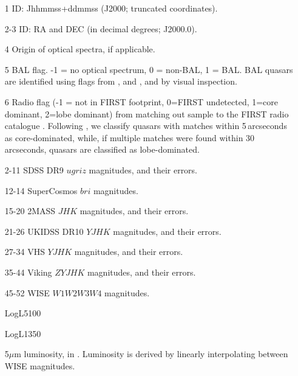 \begin{itemize}

\item[1] ID: Jhhmmss+ddmmss (J2000; truncated coordinates). 

\item[2-3] ID: RA and DEC (in decimal degrees; J2000.0).  

\item[4] Origin of optical spectra, if applicable. 

\item[5] BAL flag. -1 = no optical spectrum, 0 = non-BAL, 1 = BAL. BAL quasars are identified using flags from \citet{shen11}, \citet{allen11} and \citet{paris17}, and by visual inspection. 

\item[6] Radio flag (-1 = not in FIRST footprint, 0=FIRST undetected, 1=core dominant, 2=lobe dominant) from matching out sample to the FIRST radio catalogue \citep{white97}. Following \citet{shen11}, we classify quasars with matches within 5\,arcseconds as core-dominated, while, if multiple matches were found within 30 arcseconds, quasars are classified as lobe-dominated. 
  
\item[2-11] SDSS DR9 $ugriz$ magnitudes, and their errors. 

\item[12-14] SuperCosmos $bri$ magnitudes. 

\item[15-20] 2MASS $JHK$ magnitudes, and their errors. 

\item[21-26] UKIDSS DR10 $YJHK$ magnitudes, and their errors. 

\item[27-34] VHS $YJHK$ magnitudes, and their errors. 

\item[35-44] Viking $ZYJHK$ magnitudes, and their errors. 

\item[45-52] WISE $W1W2W3W4$ magnitudes. 

\item[] LogL5100

\item[] LogL1350

\item[] 5$\mu$m luminosity, in \ergs. Luminosity is derived by linearly interpolating between WISE magnitudes. 

\end{itemize}



 

